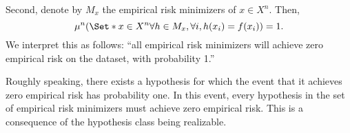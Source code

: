 Second, denote by $M_x$ the empirical risk minimizers of $x \in X^n$.
Then,
\[
\mu ^n(\Set*{x \in X^n}{\forall h \in M_x, \forall i, h(x_i) = f(x_i)}) = 1.
\]
We interpret this as follows: ``all empirical risk minimizers will achieve zero empirical risk on the dataset, with probability 1.''

Roughly speaking, there exists a hypothesis for which the event that it achieves zero empirical risk has probability one.
In this event, every hypothesis in the set of empirical risk minimizers must achieve zero empirical risk.
This is a consequence of the hypothesis class being realizable.

